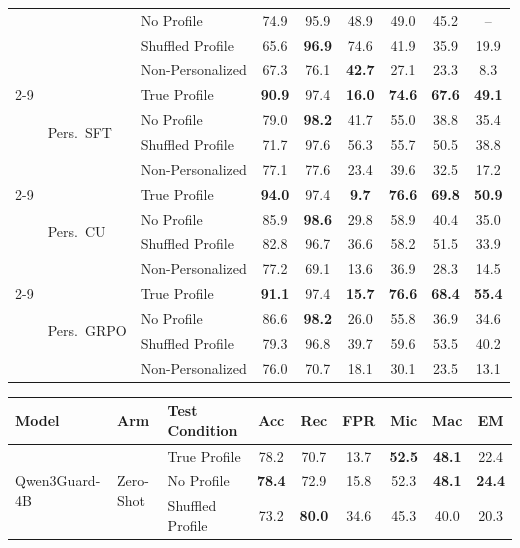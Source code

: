 \begin{table}[t]
{\begin{tabular}[t]{@{}lllcccccc@{}}
& & No Profile & 74.9 & 95.9 & 48.9 & 49.0 & 45.2 & -- \\
& & Shuffled Profile & 65.6 & \textbf{96.9} & 74.6 & 41.9 & 35.9 & 19.9 \\
& & Non-Personalized & 67.3 & 76.1 & \textbf{42.7} & 27.1 & 23.3 & 8.3 \\
\cmidrule(lr){2-9}
& \multirow{4}{*}{Pers.\ SFT}
  & True Profile & \textbf{90.9} & 97.4 & \textbf{16.0} & \textbf{74.6} & \textbf{67.6} & \textbf{49.1} \\
& & No Profile & 79.0 & \textbf{98.2} & 41.7 & 55.0 & 38.8 & 35.4 \\
& & Shuffled Profile & 71.7 & 97.6 & 56.3 & 55.7 & 50.5 & 38.8 \\
& & Non-Personalized & 77.1 & 77.6 & 23.4 & 39.6 & 32.5 & 17.2 \\
\cmidrule(lr){2-9}
& \multirow{4}{*}{Pers.\ CU}
  & True Profile & \textbf{94.0} & 97.4 & \textbf{9.7} & \textbf{76.6} & \textbf{69.8} & \textbf{50.9} \\
& & No Profile & 85.9 & \textbf{98.6} & 29.8 & 58.9 & 40.4 & 35.0 \\
& & Shuffled Profile & 82.8 & 96.7 & 36.6 & 58.2 & 51.5 & 33.9 \\
& & Non-Personalized & 77.2 & 69.1 & 13.6 & 36.9 & 28.3 & 14.5 \\
\cmidrule(lr){2-9}
& \multirow{4}{*}{Pers.\ GRPO}
  & True Profile & \textbf{91.1} & 97.4 & \textbf{15.7} & \textbf{76.6} & \textbf{68.4} & \textbf{55.4} \\
& & No Profile & 86.6 & \textbf{98.2} & 26.0 & 55.8 & 36.9 & 34.6 \\
& & Shuffled Profile & 79.3 & 96.8 & 39.7 & 59.6 & 53.5 & 40.2 \\
& & Non-Personalized & 76.0 & 70.7 & 18.1 & 30.1 & 23.5 & 13.1 \\
\bottomrule
\end{tabular}
\hspace{1.5em}
\begin{tabular}[t]{@{}lllcccccc@{}}
\toprule
\textbf{Model} & \textbf{Arm} & \textbf{Test Condition} & \textbf{Acc} & \textbf{Rec} & \textbf{FPR} & \textbf{Mic} & \textbf{Mac} & \textbf{EM} \\
\midrule
\multirow{16}{*}{Qwen3Guard-4B}
& \multirow{4}{*}{Zero-Shot}
  & True Profile & 78.2 & 70.7 & 13.7 & \textbf{52.5} & \textbf{48.1} & 22.4 \\
& & No Profile & \textbf{78.4} & 72.9 & 15.8 & 52.3 & \textbf{48.1} & \textbf{24.4} \\
& & Shuffled Profile & 73.2 & \textbf{80.0} & 34.6 & 45.3 & 40.0 & 20.3 \\

\end{tabular}}
\end{table}
